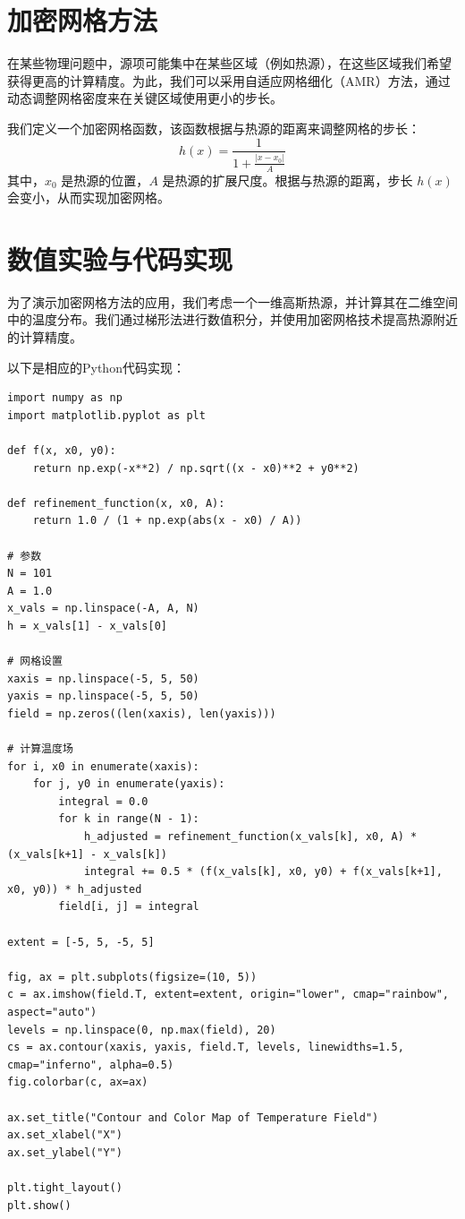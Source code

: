 \section{加密网格方法}
在某些物理问题中，源项可能集中在某些区域（例如热源），在这些区域我们希望获得更高的计算精度。为此，我们可以采用自适应网格细化（AMR）方法，通过动态调整网格密度来在关键区域使用更小的步长。

我们定义一个加密网格函数，该函数根据与热源的距离来调整网格的步长：
\[
h(x) = \frac{1}{1 + \frac{|x - x_0|}{A}}
\]
其中，\( x_0 \) 是热源的位置，\( A \) 是热源的扩展尺度。根据与热源的距离，步长 \( h(x) \) 会变小，从而实现加密网格。

\section{数值实验与代码实现}
为了演示加密网格方法的应用，我们考虑一个一维高斯热源，并计算其在二维空间中的温度分布。我们通过梯形法进行数值积分，并使用加密网格技术提高热源附近的计算精度。

以下是相应的Python代码实现：

\begin{verbatim}
import numpy as np
import matplotlib.pyplot as plt

def f(x, x0, y0):
    return np.exp(-x**2) / np.sqrt((x - x0)**2 + y0**2)

def refinement_function(x, x0, A):
    return 1.0 / (1 + np.exp(abs(x - x0) / A))

# 参数
N = 101
A = 1.0
x_vals = np.linspace(-A, A, N)
h = x_vals[1] - x_vals[0]

# 网格设置
xaxis = np.linspace(-5, 5, 50)
yaxis = np.linspace(-5, 5, 50)
field = np.zeros((len(xaxis), len(yaxis)))  

# 计算温度场
for i, x0 in enumerate(xaxis):
    for j, y0 in enumerate(yaxis):
        integral = 0.0
        for k in range(N - 1):
            h_adjusted = refinement_function(x_vals[k], x0, A) * (x_vals[k+1] - x_vals[k])
            integral += 0.5 * (f(x_vals[k], x0, y0) + f(x_vals[k+1], x0, y0)) * h_adjusted
        field[i, j] = integral

extent = [-5, 5, -5, 5]

fig, ax = plt.subplots(figsize=(10, 5))
c = ax.imshow(field.T, extent=extent, origin="lower", cmap="rainbow", aspect="auto")
levels = np.linspace(0, np.max(field), 20)
cs = ax.contour(xaxis, yaxis, field.T, levels, linewidths=1.5, cmap="inferno", alpha=0.5)
fig.colorbar(c, ax=ax)

ax.set_title("Contour and Color Map of Temperature Field")
ax.set_xlabel("X")
ax.set_ylabel("Y")

plt.tight_layout()
plt.show()
\end{verbatim}

